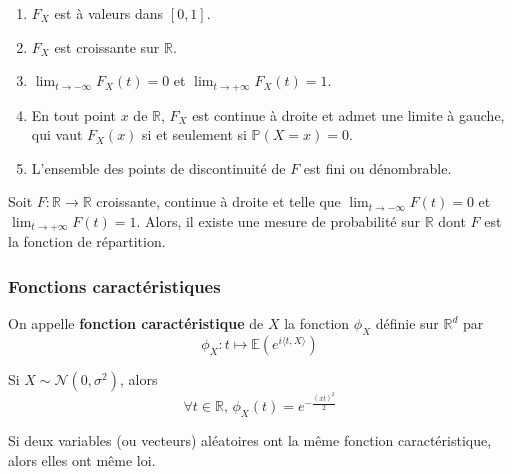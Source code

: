   \begin{theorem}
    \begin{enumerate}[label=(\roman*)]
      \item $F_X$ est à valeurs dans $[0,1]$.
      \item $F_X$ est croissante sur $\mathbb{R}$.
      \item $\lim_{t \rightarrow -\infty} F_X(t) = 0$ et $\lim_{t \rightarrow +\infty} F_X(t) = 1$.
      \item En tout point $x$ de $\mathbb{R}$, $F_X$ est continue à droite et admet une limite à gauche, qui vaut $F_X(x)$ si et seulement si $\mathbb{P}(X=x) = 0$.
      \item L'ensemble des points de discontinuité de $F$ est fini ou dénombrable.
    \end{enumerate}
  \end{theorem}

  \begin{theorem}
    Soit $F : \mathbb{R} \rightarrow \mathbb{R}$ croissante, continue à droite et telle que $\lim_{t \rightarrow -\infty} F(t) = 0$ et $\lim_{t \rightarrow +\infty} F(t) = 1$. Alors, il existe une mesure de probabilité sur $\mathbb{R}$ dont $F$ est la fonction de répartition.
  \end{theorem}

  \subsubsection{Fonctions caractéristiques}


  \begin{definition}
    On appelle \textbf{fonction caractéristique} de $X$ la fonction $\phi_X$ définie sur $\mathbb{R}^d$ par
    \[ \phi_X : t \mapsto \mathbb{E}\left( e^{i \langle t, X \rangle} \right) \]
  \end{definition}


  \begin{example}
    Si $X \sim \mathcal{N}(0, \sigma^2)$, alors
    \[ \forall t \in \mathbb{R}, \, \phi_X(t) = e^{-\frac{(xt)^2}{2}} \]
  \end{example}


  \begin{theorem}
    Si deux variables (ou vecteurs) aléatoires ont la même fonction caractéristique, alors elles ont même loi.
  \end{theorem}

